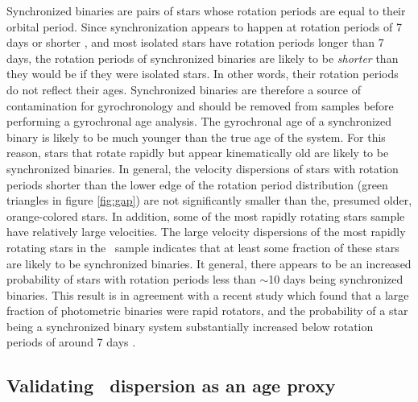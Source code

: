 Synchronized binaries are pairs of stars whose rotation periods are equal to
their orbital period.
Since synchronization appears to happen at rotation periods of 7 days or
shorter \citep{simonian2019}, and most isolated stars have rotation periods
longer than 7 days, the rotation periods of synchronized binaries are likely
to be {\it shorter} than they would be if they were isolated stars.
In other words, their rotation periods do not reflect their ages.
Synchronized binaries are therefore a source of contamination for
gyrochronology and should be removed from samples before performing a
gyrochronal age analysis.
The gyrochronal age of a synchronized binary is likely to be much younger than
the true age of the system.
For this reason, stars that rotate rapidly but appear kinematically old are
likely to be synchronized binaries.
In general, the velocity dispersions of stars with rotation periods shorter
than the lower edge of the rotation period distribution (green triangles in
figure \ref{fig:gap}) are
not significantly smaller than the, presumed older, orange-colored stars.
In addition, some of the most rapidly rotating stars sample have relatively
large velocities.
The large velocity dispersions of the most rapidly rotating stars in the \mct\
sample indicates that at least some fraction of these stars are likely to be
synchronized binaries.
It general, there appears to be an increased probability of stars with
rotation periods less than $\sim$10 days being synchronized binaries.
This result is in agreement with a recent study which found that a large
fraction of photometric binaries were rapid rotators, and the probability of a
star being a synchronized binary system substantially increased below rotation
periods of around 7 days \citep{simonian2019}.

\subsection{Validating \vb\ dispersion as an age proxy}
\label{sec:mass-dependent-heating}

